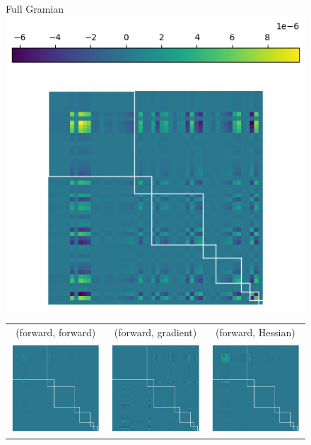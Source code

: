 \begin{figure}
  \centering
  Full Gramian\\
  \includegraphics[width=0.43\linewidth]{../kfac_pinns_exp/exp04_gramian_contributions/fig/gram_full.png}

  \begin{tabular}{ccc}
    (forward, forward)
    &
      (forward, gradient)
    &
      (forward, Hessian)
    \\
    \includegraphics[width=0.33\linewidth]{../kfac_pinns_exp/exp04_gramian_contributions/fig/gram_output_output.png}
    &
      \includegraphics[width=0.33\linewidth]{../kfac_pinns_exp/exp04_gramian_contributions/fig/gram_output_grad_input.png}
    &
      \includegraphics[width=0.33\linewidth]{../kfac_pinns_exp/exp04_gramian_contributions/fig/gram_output_hess_input.png}

\end{tabular}
\end{figure}
